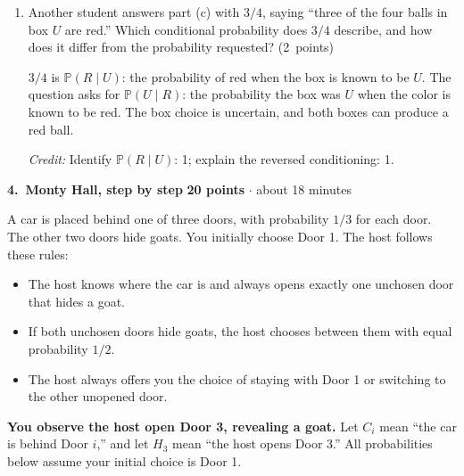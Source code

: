 \documentclass[11pt,letterpaper]{article}
\newcommand{\Prob}{\mathbb P}
\newcommand{\partpts}[1]{\unskip\nobreak\hspace{.3em}%
  \mbox{\small\color{muted}(#1 points)}}
\newcommand{\credit}[1]{\par{\footnotesize\color{muted}\textit{Credit:} #1}}
\newcommand{\problem}[4]{\par\addvspace{8pt}%
  {\large\bfseries\color{indigo}#1.\ #2}\hfill
  {\small\color{muted}\textbf{#3 points} $\cdot$ about #4 minutes}\par\nobreak}
\begin{document}
\begin{enumerate}
  \item Another student answers part (c) with $3/4$, saying ``three of the
  four balls in box $U$ are red.'' Which conditional probability does $3/4$
  describe, and how does it differ from the probability requested? \partpts{2}
  \begin{solution}[1.15in]
    $3/4$ is $\Prob(R\mid U)$: the probability of red when the box is known
    to be $U$. The question asks for $\Prob(U\mid R)$: the probability the
    box was $U$ when the color is known to be red. The box choice is
    uncertain, and both boxes can produce a red ball.
    \credit{Identify $\Prob(R\mid U)$: 1; explain the reversed conditioning: 1.}
  \end{solution}
\end{enumerate}

\newpage
\problem{4}{Monty Hall, step by step}{20}{18}
A car is placed behind one of three doors, with probability $1/3$ for each
door. The other two doors hide goats. You initially choose Door 1.
The host follows these rules:
\begin{itemize}
  \item The host knows where the car is and always opens exactly one
  unchosen door that hides a goat.
  \item If both unchosen doors hide goats, the host chooses between them
  with equal probability $1/2$.
  \item The host always offers you the choice of staying with Door 1 or
  switching to the other unopened door.
\end{itemize}
\textbf{You observe the host open Door 3, revealing a goat.}
Let $C_i$ mean ``the car is behind Door $i$,'' and let $H_3$ mean
``the host opens Door 3.'' All probabilities below assume your initial
choice is Door 1.
\end{document}
